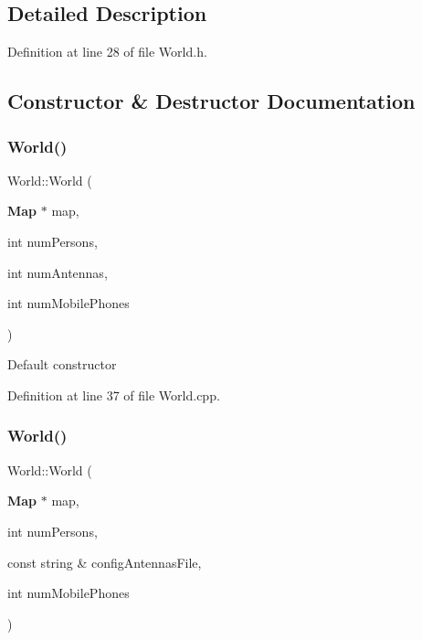 \subsection{Detailed Description}


Definition at line 28 of file World.\+h.



\subsection{Constructor \& Destructor Documentation}
\mbox{\label{class_world_a94871f094bb3eabb67f5bd1b10396832}} 
\subsubsection{World()\hspace{0.1cm}{\footnotesize\ttfamily [1/3]}}
{\footnotesize\ttfamily World\+::\+World (\begin{DoxyParamCaption}\item[{\textbf{ Map} $\ast$}]{map,  }\item[{int}]{num\+Persons,  }\item[{int}]{num\+Antennas,  }\item[{int}]{num\+Mobile\+Phones }\end{DoxyParamCaption})}

Default constructor 

Definition at line 37 of file World.\+cpp.

\mbox{\label{class_world_a5a02572c10d750037a8c604a7d806550}} 
\subsubsection{World()\hspace{0.1cm}{\footnotesize\ttfamily [2/3]}}
{\footnotesize\ttfamily World\+::\+World (\begin{DoxyParamCaption}\item[{\textbf{ Map} $\ast$}]{map,  }\item[{int}]{num\+Persons,  }\item[{const string \&}]{config\+Antennas\+File,  }\item[{int}]{num\+Mobile\+Phones }\end{DoxyParamCaption})\hspace{0.3cm}{\ttfamily [noexcept]}}



